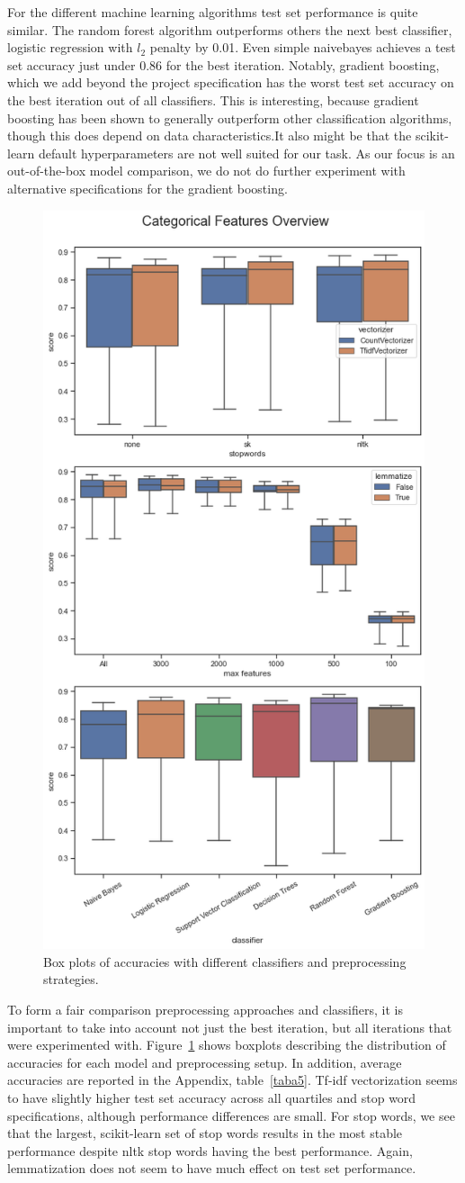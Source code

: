 \documentclass[conference]{IEEEtran}
\begin{document}
For the different machine learning algorithms test set performance is quite similar. The random forest algorithm outperforms others the next best classifier, logistic regression with $l_2$ penalty by 0.01. Even simple naivebayes achieves a test set accuracy just under 0.86 for the best iteration. Notably, gradient boosting, which we add beyond the project specification has the worst test set accuracy on the best iteration out of all classifiers. This is interesting, because gradient boosting has been shown to generally outperform other classification algorithms, though this does depend on data characteristics\cite{gbacc}.It also might be that the scikit-learn default hyperparameters are not well suited for our task. As our focus is an out-of-the-box model comparison, we do not do further experiment with alternative specifications for the gradient boosting.

\begin{figure}[htbp]
\centerline{\includegraphics[width = 0.5 \textwidth]{fig2.png}}
\caption{Box plots of accuracies with different classifiers and preprocessing strategies.}
\label{fig2}
\end{figure}

To form a fair comparison preprocessing approaches and classifiers, it is important to take into account not just the best iteration, but all iterations that were experimented with. Figure~\ref{fig2}  shows boxplots describing the distribution of accuracies for each model and preprocessing setup. In addition, average accuracies are reported in the Appendix, table~\ref{taba5}. Tf-idf vectorization seems to have slightly higher test set accuracy across all quartiles and stop word specifications, although performance differences are small. For stop words, we see that the largest, scikit-learn set of stop words results in the most stable performance despite nltk stop words having the best performance. Again, lemmatization does not seem to have much effect on test set performance.
\end{document}
